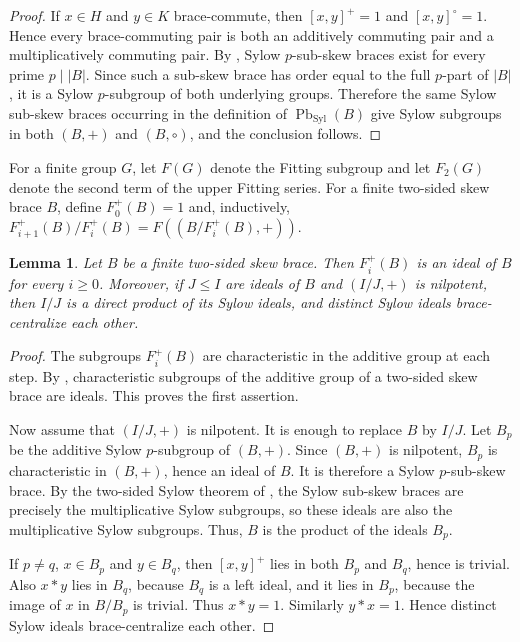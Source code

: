 \documentclass[11pt, oneside]{amsart}
\numberwithin{equation}{section}
\theoremstyle{plain}
\newtheorem{lem}[equation]{Lemma}
\theoremstyle{definition}
\newcommand{\Pb}{\operatorname{Pb} }
\newcommand{\Syl}{\operatorname{Syl} }
\begin{document}
\begin{proof}
If $x\in H$ and $y\in K$ brace-commute, then $[x,y]^+=1$ and
$[x,y]^\circ=1$. Hence every brace-commuting pair is both an additively
commuting pair and a multiplicatively commuting pair. By \cite{Tru26}, Sylow $p$-sub-skew braces exist for every prime $p \mid |B|$. Since such a sub-skew brace has order equal to the full $p$-part of $|B|$, it is a Sylow $p$-subgroup of both underlying groups. Therefore the same Sylow sub-skew braces occurring in the definition of $\Pb_{\Syl}(B)$ give Sylow subgroups in both $(B,+)$ and $(B,\circ)$, and the conclusion follows.
\end{proof}

For a finite group $G$, let $F(G)$ denote the Fitting subgroup and let
$F_2(G)$ denote the second term of the upper Fitting series. For a finite
two-sided skew brace $B$, define $F^+_0(B)= 1$ and, inductively,
$F^+_{i+1}(B)/F^+_i(B)=F((B/F^+_i(B),+))$.

\begin{lem}\label{lem:additive-fitting-ideals-sylow}
Let $B$ be a finite two-sided skew brace. Then $F^+_i(B)$ is an ideal of
$B$ for every $i\geqslant 0$. Moreover, if $J\leqslant I$ are ideals of $B$ and
$(I/J,+)$ is nilpotent, then $I/J$ is a direct product of its Sylow ideals,
and distinct Sylow ideals brace-centralize each other.
\end{lem}

\begin{proof}
The subgroups $F^+_i(B)$ are characteristic in the additive group at each
step. By \cite[Lemma 4.1]{Nas19}, characteristic subgroups of the additive group of a two-sided skew brace are ideals. This proves
the first assertion.

Now assume that $(I/J,+)$ is nilpotent. It is enough to replace $B$ by
$I/J$. Let $B_p$ be the additive Sylow $p$-subgroup of $(B,+)$. Since
$(B,+)$ is nilpotent, $B_p$ is characteristic in $(B,+)$, hence an ideal of
$B$. It is therefore a Sylow $p$-sub-skew brace. By the two-sided Sylow
theorem of \cite[Theorem 14]{CDMFT26}, the Sylow sub-skew braces are
precisely the multiplicative Sylow subgroups, so these ideals are also the
multiplicative Sylow subgroups. Thus, $B$ is the product of the ideals
$B_p$.

If $p\neq q$, $x\in B_p$ and $y\in B_q$, then $[x,y]^+$ lies in both
$B_p$ and $B_q$, hence is trivial. Also $x*y$ lies in $B_q$, because $B_q$
is a left ideal, and it lies in $B_p$, because the image of $x$ in
$B/B_p$ is trivial. Thus $x*y= 1$. Similarly $y*x= 1$. Hence distinct Sylow
ideals brace-centralize each other.
\end{proof}
\end{document}
